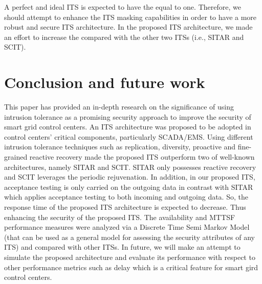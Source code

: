 \documentclass[preprint,number,12pt]{elsarticle}
\begin{document}
A perfect and ideal ITS is expected to have the  equal to one. Therefore, we should attempt to enhance the ITS masking capabilities in order to have a more robust and secure ITS architecture. In the proposed ITS architecture, we made an effort to increase the  compared with the other two ITSs (i.e., SITAR and SCIT).
\section{Conclusion and future work} \label{sec: conclusion}
This paper has provided an in-depth research on the significance of using intrusion tolerance as a promising security approach to improve the security of smart grid control centers. An ITS architecture was proposed to be adopted in control centers' critical components, particularly SCADA/EMS. Using different intrusion tolerance techniques such as replication, diversity, proactive and fine-grained reactive recovery made the proposed ITS outperform two of well-known architectures, namely SITAR and SCIT. SITAR only possesses reactive recovery and SCIT leverages the periodic rejuvenation. In addition, in our proposed ITS, acceptance testing is only carried on the outgoing data in contrast with SITAR which applies acceptance testing to both incoming and outgoing data. So, the response time of the proposed ITS architecture is expected to decrease. Thus enhancing the security of the proposed ITS. The availability and MTTSF performance measures were analyzed via a Discrete Time Semi Markov Model (that can be used as a general model for assessing the security attributes of any ITS) and compared with other ITSs. In future, we will make an attempt to simulate the proposed  architecture and evaluate its performance with respect to other performance metrics such as delay which is a critical feature for smart gird control centers.
\end{document}
